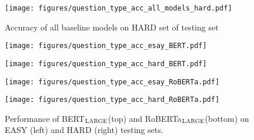 \documentclass{article} \usepackage{iclr2020_conference,times}
\newcommand\bertbase{BERT$_{\small \textsc{BASE}}$\xspace}
\newcommand\bertlarge{BERT$_{\small \textsc{LARGE}}$\xspace}
\newcommand\xlnetbase{XLNet$_{\small \textsc{BASE}}$\xspace}
\newcommand\robertabase{RoBERTa$_{\small \textsc{BASE}}$\xspace}
\newcommand\robertalarge{RoBERTa$_{\small \textsc{LARGE}}$\xspace}
\begin{document}
	
	\begin{figure}[htbp]
		\begin{center}
\texttt{[image: figures/question\_type\_acc\_all\_models\_hard.pdf]}
		\end{center}
		\caption{Accuracy of all baseline models on HARD set of testing set}
		\label{fig:question_type_acc_all_models_hard}
	\end{figure}
	
	
    \begin{figure}[htbp]
        \centering
            \begin{minipage}[t]{0.49\textwidth}
                \centering
                \texttt{[image: figures/question\_type\_acc\_esay\_BERT.pdf]}
            \end{minipage}
            \begin{minipage}[t]{0.49\textwidth}
                \centering
                \texttt{[image: figures/question\_type\_acc\_hard\_BERT.pdf]}
            \end{minipage}
            \begin{minipage}[t]{0.49\textwidth}
                \centering
                \texttt{[image: figures/question\_type\_acc\_esay\_RoBERTa.pdf]}
            \end{minipage}
            \begin{minipage}[t]{0.49\textwidth}
                \centering
                \texttt{[image: figures/question\_type\_acc\_hard\_RoBERTa.pdf]}
            \end{minipage}
        \caption{Performance of \bertlarge(top) and \robertalarge(bottom) on EASY (left) and HARD (right) testing sets. }
        \label{fig:BERT_RoBERTa_easy_and_hard_questioni_type_acc}
    \end{figure}


\begin{comment}
\begin{table}[ht]
	\small
	\caption{Overlap of different models after intersection among 4 random seed}
	\label{option-input}
	\begin{center}
		\begin{tabular}{l|ccccc}
			 & \multicolumn{1}{c}{GPT}  &\multicolumn{1}{c}{GPT-2} &\multicolumn{1}{c}{\bertbase} &\multicolumn{1}{c}{\xlnetbase} &\multicolumn{1}{c}{\robertabase}\\
			\hline
			GPT &           \bf 245 & 164 & 152 & 142 & 116\\
			GPT-2 &         164 & \bf 238 & 151 & 144 & 123\\
			\bertbase &     152 & 151 & \bf 234 & 138 & 124 \\
			\xlnetbase &    142 & 144 & 138 & \bf 225  & 125\\
			\robertabase &  116 & 123 & 124 & 125 & \bf 200\\

		\end{tabular}
	\end{center}
\end{table}
\end{comment}
\newpage

 
\end{document}

